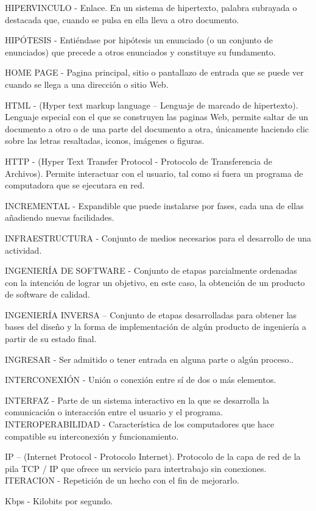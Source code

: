 HIPERVINCULO - Enlace. En un sistema de hipertexto, palabra subrayada o destacada que, cuando se pulsa en ella lleva a otro documento.

HIPÓTESIS - Entiéndase por hipótesis un enunciado (o un conjunto de enunciados) que precede a otros enunciados y constituye su fundamento.

HOME PAGE -  Pagina principal, sitio o pantallazo de entrada que se puede ver cuando se llega a una dirección o sitio Web.

HTML - (Hyper text markup language – Lenguaje de marcado de hipertexto). Lenguaje especial con el que se construyen las paginas Web, permite saltar de un documento a otro o de una parte del documento a otra, únicamente haciendo clic sobre las letras resaltadas, iconos, imágenes o figuras.

HTTP -  (Hyper Text Transfer Protocol - Protocolo de Transferencia de Archivos). Permite interactuar con el usuario, tal como si fuera un programa de computadora que se ejecutara en red.

INCREMENTAL - Expandible que puede instalarse por fases, cada una de ellas añadiendo nuevas facilidades.

INFRAESTRUCTURA - Conjunto de medios necesarios para el desarrollo de una actividad. 

INGENIERÍA DE SOFTWARE - Conjunto de etapas parcialmente ordenadas con la intención de lograr un objetivo, en este caso, la obtención de un producto de software de calidad.

INGENIERÍA INVERSA – Conjunto de etapas desarrolladas para obtener las bases del diseño y la forma de implementación de algún producto de ingeniería a partir de su estado final.

INGRESAR - Ser admitido o tener entrada en alguna parte o algún proceso..

INTERCONEXIÓN - Unión o conexión entre sí de dos o más elementos.

INTERFAZ - Parte de un sistema interactivo en la que se desarrolla la comunicación o interacción entre el usuario y el programa.
INTEROPERABILIDAD - Característica de los computadores que hace compatible su interconexión y funcionamiento.

IP – (Internet Protocol - Protocolo Internet). Protocolo de la capa de red de la pila TCP / IP que ofrece un servicio para intertrabajo sin conexiones.
ITERACION - Repetición de un hecho con el fin de mejorarlo.

Kbps -  Kilobits por segundo.

